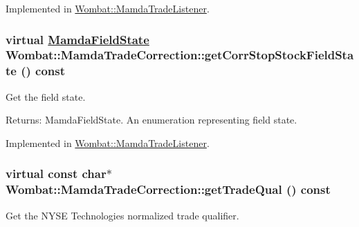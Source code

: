 Implemented in \hyperlink{classWombat_1_1MamdaTradeListener_620da60bcf2ae217b3964f677a342c88}{Wombat::Mamda\-Trade\-Listener}.\hypertarget{classWombat_1_1MamdaTradeCorrection_90f75c0681775f5b3d473a3154d91676}{
\subsubsection[getCorrStopStockFieldState]{\setlength{\rightskip}{0pt plus 5cm}virtual \hyperlink{namespaceWombat_93aac974f2ab713554fd12a1fa3b7d2a}{Mamda\-Field\-State} Wombat::Mamda\-Trade\-Correction::get\-Corr\-Stop\-Stock\-Field\-State () const}}
\label{classWombat_1_1MamdaTradeCorrection_90f75c0681775f5b3d473a3154d91676}


Get the field state. 

\begin{Desc}
\item[Returns:]Mamda\-Field\-State. An enumeration representing field state. \end{Desc}


Implemented in \hyperlink{classWombat_1_1MamdaTradeListener_92765656c70234295c688b60b2e1b50a}{Wombat::Mamda\-Trade\-Listener}.\hypertarget{classWombat_1_1MamdaTradeCorrection_f8a227326bbe7e5b948a1e573b92a2b4}{
\subsubsection[getTradeQual]{\setlength{\rightskip}{0pt plus 5cm}virtual const char$\ast$ Wombat::Mamda\-Trade\-Correction::get\-Trade\-Qual () const}}
\label{classWombat_1_1MamdaTradeCorrection_f8a227326bbe7e5b948a1e573b92a2b4}


Get the NYSE Technologies normalized trade qualifier. 

